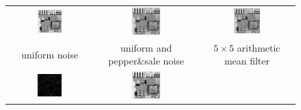 \documentclass[11pt,a4paper]{article}
\begin{document}
\begin{figure}[!htbp]
	\centering
	\begin{tabular}{ccc} 
		\includegraphics[width=0.3\textwidth]{pro4/5_12_a}&
		\includegraphics[width=0.3\textwidth]{pro4/5_12_b}&
		\includegraphics[width=0.3\textwidth]{pro4/5_12_c} \\
		uniform noise &  uniform and pepper\&sale noise &  $5\times 5$ arithmetic mean filter\\
		\includegraphics[width=0.3\textwidth]{pro4/5_12_d}&
		\includegraphics[width=0.3\textwidth]{pro4/5_12_e}&

\end{tabular}
\end{figure}
\end{document}
